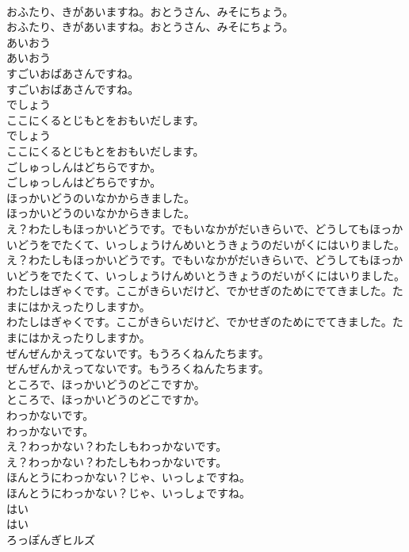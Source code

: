 \documentclass[8pt]{extreport}
\begin{document}
\begin{CJK}{UTF8}{min}
\\	おふたり、きがあいますね。おとうさん、みそにちょう。
\\	おふたり、きがあいますね。おとうさん、みそにちょう。
\\	あいおう
\\	あいおう
\\	すごいおばあさんですね。
\\	すごいおばあさんですね。
\\	でしょう
\\	ここにくるとじもとをおもいだします。
\\	でしょう
\\	ここにくるとじもとをおもいだします。
\\	ごしゅっしんはどちらですか。
\\	ごしゅっしんはどちらですか。
\\	ほっかいどうのいなかからきました。
\\	ほっかいどうのいなかからきました。
\\	え？わたしもほっかいどうです。でもいなかがだいきらいで、どうしてもほっかいどうをでたくて、いっしょうけんめいとうきょうのだいがくにはいりました。
\\	え？わたしもほっかいどうです。でもいなかがだいきらいで、どうしてもほっかいどうをでたくて、いっしょうけんめいとうきょうのだいがくにはいりました。
\\	わたしはぎゃくです。ここがきらいだけど、でかせぎのためにでてきました。たまにはかえったりしますか。
\\	わたしはぎゃくです。ここがきらいだけど、でかせぎのためにでてきました。たまにはかえったりしますか。
\\	ぜんぜんかえってないです。もうろくねんたちます。
\\	ぜんぜんかえってないです。もうろくねんたちます。
\\	ところで、ほっかいどうのどこですか。
\\	ところで、ほっかいどうのどこですか。
\\	わっかないです。
\\	わっかないです。
\\	え？わっかない？わたしもわっかないです。
\\	え？わっかない？わたしもわっかないです。
\\	ほんとうにわっかない？じゃ、いっしょですね。
\\	ほんとうにわっかない？じゃ、いっしょですね。
\\	はい
\\	はい
\\	ろっぽんぎヒルズ

\end{CJK}
\end{document}
